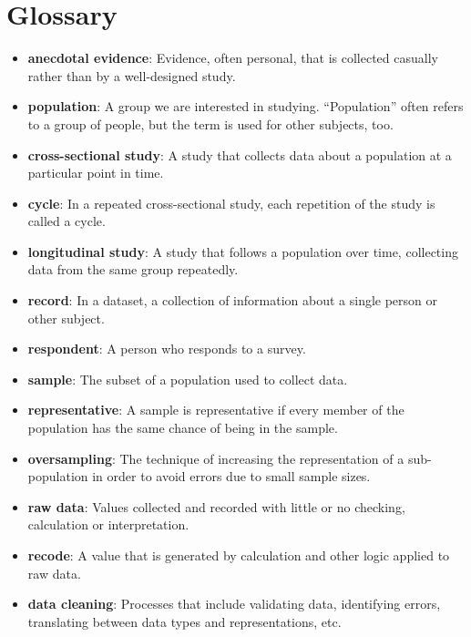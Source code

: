 \documentclass[12pt]{book}
\theoremstyle{exercise}
\begin{document}
\section{Glossary}

\begin{itemize}

\item {\bf anecdotal evidence}: Evidence, often personal, that is collected
  casually rather than by a well-designed study.%

\item {\bf population}: A group we are interested in studying.
  ``Population'' often refers to a
  group of people, but the term is used for other subjects,
  too.%

\item {\bf cross-sectional study}: A study that collects data about a
population at a particular point in time.%
%

\item {\bf cycle}: In a repeated cross-sectional study, each repetition
of the study is called a cycle.

\item {\bf longitudinal study}: A study that follows a population over
time, collecting data from the same group repeatedly.%
%

\item {\bf record}: In a dataset, a collection of information about
a single person or other subject.%

\item {\bf respondent}: A person who responds to a survey.%

\item {\bf sample}: The subset of a population used to collect data.%

\item {\bf representative}: A sample is representative if every member
of the population has the same chance of being in the sample.%

\item {\bf oversampling}: The technique of increasing the representation
of a sub-population in order to avoid errors due to small sample
sizes.%

\item {\bf raw data}: Values collected and recorded with little or no
checking, calculation or interpretation.%

\item {\bf recode}: A value that is generated by calculation and other
logic applied to raw data.%

\item {\bf data cleaning}: Processes that include validating data,
  identifying errors, translating between data types and
  representations, etc.

\end{itemize}
\end{document}
